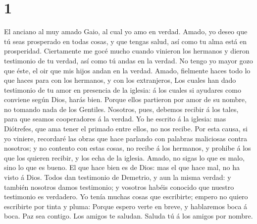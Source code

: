 \hypertarget{section}{%
\section{1}\label{section}}

 El anciano al muy amado Gaio, al cual yo amo en verdad.
 Amado, yo deseo que tú seas prosperado en todas cosas, y
que tengas salud, así como tu alma está en prosperidad. 
Ciertamente me gocé mucho cuando vinieron los hermanos y dieron
testimonio de tu verdad, así como tú andas en la verdad. 
No tengo yo mayor gozo que éste, el oir que mis hijos andan en la
verdad.  Amado, fielmente haces todo lo que haces para con
los hermanos, y con los extranjeros,  Los cuales han dado
testimonio de tu amor en presencia de la iglesia: á los cuales si
ayudares como conviene según Dios, harás bien.  Porque
ellos partieron por amor de su nombre, no tomando nada de los Gentiles.
 Nosotros, pues, debemos recibir á los tales, para que
seamos cooperadores á la verdad.  Yo he escrito á la
iglesia: mas Diótrefes, que ama tener el primado entre ellos, no nos
recibe.  Por esta causa, si yo viniere, recordaré las
obras que hace parlando con palabras maliciosas contra nosotros; y no
contento con estas cosas, no recibe á los hermanos, y prohibe á los que
los quieren recibir, y los echa de la iglesia.  Amado, no
sigas lo que es malo, sino lo que es bueno. El que hace bien es de Dios:
mas el que hace mal, no ha visto á Dios.  Todos dan
testimonio de Demetrio, y aun la misma verdad: y también nosotros damos
testimonio; y vosotros habéis conocido que nuestro testimonio es
verdadero.  Yo tenía muchas cosas que escribirte; empero
no quiero escribirte por tinta y pluma:  Porque espero
verte en breve, y hablaremos boca á boca. Paz sea contigo. Los amigos te
saludan. Saluda tú á los amigos por nombre.
